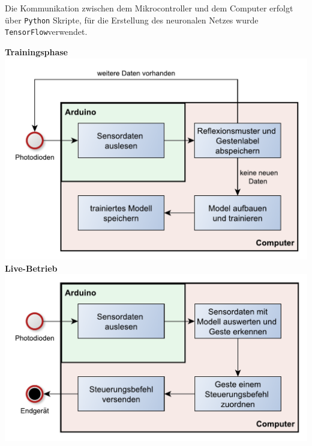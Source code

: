 \documentclass{sciposter}
\begin{document}
\begin{multicols}{3}
\noindent
Die Kommunikation zwischen dem Mikrocontroller und dem Computer erfolgt über \texttt{Python} Skripte, für die Erstellung des neuronalen Netzes wurde \texttt{TensorFlow}\texttrademark verwendet.

\noindent
	\centering
\textbf{Trainingsphase}\\
\includegraphics[scale=1]{../figures/AblaufTraining.pdf}
\noindent
\textbf{Live-Betrieb}\\
\includegraphics[scale=1]{../figures/AblaufSteuerung.pdf}

%
%
%	
%	
%


\end{multicols}
\end{document}
